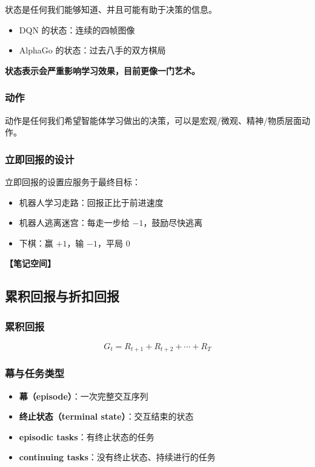 \documentclass[12pt,a4paper]{article}
\newcommand{\notespace}[1][3cm]{%
  \vspace{#1}%
  \noindent\textbf{【笔记空间】}%
  \vspace{#1}%
}
\newcommand{\1}{\mathbf{1}}
\begin{document}
状态是任何我们能够知道、并且可能有助于决策的信息。

\begin{itemize}[leftmargin=2em]
  \item DQN 的状态：连续的四帧图像
  \item AlphaGo 的状态：过去八手的双方棋局
\end{itemize}

\textbf{状态表示会严重影响学习效果，目前更像一门艺术。}

\subsubsection*{动作}

动作是任何我们希望智能体学习做出的决策，可以是宏观/微观、精神/物质层面动作。

\subsubsection*{立即回报的设计}

立即回报的设置应服务于最终目标：

\begin{itemize}[leftmargin=2em]
  \item 机器人学习走路：回报正比于前进速度
  \item 机器人逃离迷宫：每走一步给 $-1$，鼓励尽快逃离
  \item 下棋：赢 $+1$，输 $-1$，平局 $0$
\end{itemize}

\notespace[2cm]

\subsection{累积回报与折扣回报}

\subsubsection*{累积回报}

\begin{equation}
G_t = R_{t+1}+R_{t+2}+\cdots+R_T
\end{equation}

\subsubsection*{幕与任务类型}

\begin{itemize}[leftmargin=2em]
  \item \textbf{幕（episode）}：一次完整交互序列
  \item \textbf{终止状态（terminal state）}：交互结束的状态
  \item \textbf{episodic tasks}：有终止状态的任务
  \item \textbf{continuing tasks}：没有终止状态、持续进行的任务
\end{itemize}
\end{document}
